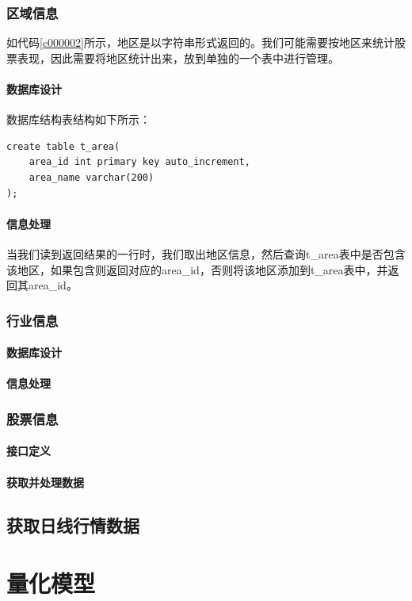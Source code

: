 \documentclass{article}
\begin{document}
\subsubsection{区域信息}
如代码\ref{c000002}所示，地区是以字符串形式返回的。我们可能需要按地区来统计股票表现，因此需要将地区统计出来，放到单独的一个表中进行管理。
\paragraph{数据库设计}
数据库结构表结构如下所示：
\begin{lstlisting}
create table t_area(
	area_id int primary key auto_increment,
	area_name varchar(200)
);
\end{lstlisting}
\paragraph{信息处理}
当我们读到返回结果的一行时，我们取出地区信息，然后查询t\_area表中是否包含该地区，如果包含则返回对应的area\_id，否则将该地区添加到t\_area表中，并返回其area\_id。
\subsubsection{行业信息}
\paragraph{数据库设计}
\paragraph{信息处理}
\subsubsection{股票信息}
\paragraph{接口定义}
\paragraph{获取并处理数据}
\subsection{获取日线行情数据}
\section{量化模型}
\end{document}
